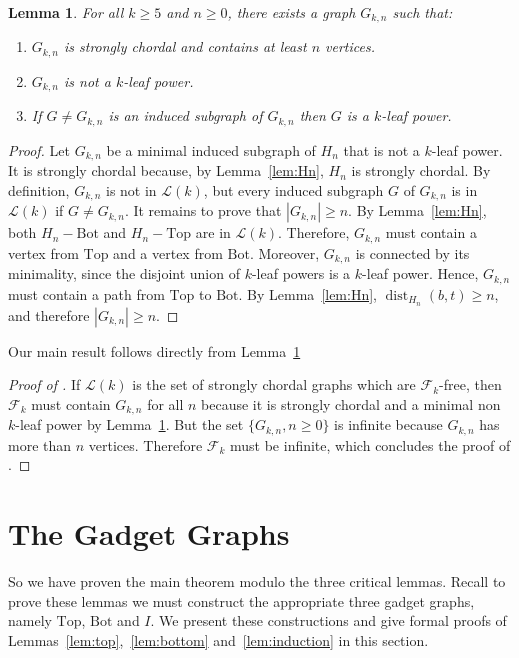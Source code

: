 \documentclass[11pt,letter]{article}
\newtheorem{lemma}[theorem]{Lemma}
\theoremstyle{remark}
\newcommand{\T}{\text{Top}}
\newcommand{\B}{\text{Bot}}
\newcommand{\F}{\mathscr{F}}
\renewcommand{\L}{\mathcal{L}}
\DeclareMathOperator{\dist}{dist}
\begin{document}
\begin{lemma}\label{lem:Gn}
    For all $k\geq 5$ and $n\geq 0$, there exists a graph $G_{k,n}$ such that:
\begin{enumerate}
    \item $G_{k,n}$ is strongly chordal and contains at least $n$ vertices.
    \item $G_{k,n}$ is not a $k$-leaf power.
    \item If $G\neq G_{k,n}$ is an induced subgraph of $G_{k,n}$ then $G$ is a $k$-leaf power.
\end{enumerate}
\end{lemma}
\begin{proof}
Let $G_{k,n}$ be a minimal induced subgraph of $H_n$ that is not a $k$-leaf power. It is strongly chordal because, by Lemma~\ref{lem:Hn}, $H_n$ is strongly chordal. By definition, $G_{k,n}$ is not in $\mathcal{L}(k)$, but every induced subgraph $G$ of $G_{k,n}$ is in $\mathcal{L}(k)$ if $G\neq G_{k,n}$. It remains to prove that $|G_{k,n}| \geq n$. By Lemma~\ref{lem:Hn}, both $H_n - \B$ and $H_n - \T$ are in $\mathcal{L}(k)$. Therefore, $G_{k,n}$ must contain a vertex from $\T$ and a vertex from $\B$. Moreover, $G_{k,n}$ is connected by its minimality, since the disjoint union of $k$-leaf powers is a $k$-leaf power. Hence, $G_{k,n}$ must contain a path from $\T$ to $\B$. By Lemma~\ref{lem:Hn}, $\dist_{H_n}(b,t) \geq n$, and therefore $|G_{k,n}| \geq n$.
\end{proof}

Our main result follows directly from Lemma~\ref{lem:Gn}

\begin{proof}[Proof of ]
If $\L(k)$ is the set of strongly chordal graphs which are $\F_k$-free, then $\F_k$ must contain $G_{k,n}$ for all $n$ because it is strongly chordal and a minimal non $k$-leaf power by Lemma~\ref{lem:Gn}. But the set $\{G_{k,n}, n \geq 0\}$ is infinite because $G_{k,n}$ has more than $n$ vertices. Therefore $\F_k$ must be infinite, which concludes the proof of .
\end{proof}





\section{The Gadget Graphs}\label{sec:gadgets}

So we have proven the main theorem modulo the three critical lemmas.
Recall to prove these lemmas we must construct the appropriate three gadget graphs, namely $\T$, $\B$ and $I$.
We present these constructions and give formal proofs of 
Lemmas~\ref{lem:top},~\ref{lem:bottom} and~\ref{lem:induction} in this section.
\end{document}
